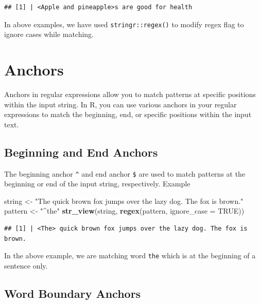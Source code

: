 \documentclass[
]{book}
\newenvironment{Shaded}{\begin{snugshade}}{\end{snugshade}}
\newcommand{\AttributeTok}[1]{\textcolor[rgb]{0.13,0.29,0.53}{#1}}
\newcommand{\ConstantTok}[1]{\textcolor[rgb]{0.56,0.35,0.01}{#1}}
\newcommand{\FunctionTok}[1]{\textcolor[rgb]{0.13,0.29,0.53}{\textbf{#1}}}
\newcommand{\NormalTok}[1]{#1}
\newcommand{\OtherTok}[1]{\textcolor[rgb]{0.56,0.35,0.01}{#1}}
\newcommand{\StringTok}[1]{\textcolor[rgb]{0.31,0.60,0.02}{#1}}
\begin{document}
\begin{verbatim}
## [1] | <Apple and pineapple>s are good for health
\end{verbatim}

In above examples, we have used \texttt{stringr::regex()} to modify regex flag to ignore cases while matching.

\hypertarget{anchors}{%
\section{Anchors}\label{anchors}}

Anchors in regular expressions allow you to match patterns at specific positions within the input string. In R, you can use various anchors in your regular expressions to match the beginning, end, or specific positions within the input text.

\hypertarget{beginning-and-end-anchors}{%
\subsection{Beginning and End Anchors}\label{beginning-and-end-anchors}}

The beginning anchor \texttt{\^{}} and end anchor \texttt{\$} are used to match patterns at the beginning or end of the input string, respectively. Example

\begin{Shaded}
\begin{Highlighting}[]
\NormalTok{string }\OtherTok{\textless{}{-}} \StringTok{"The quick brown fox jumps over the lazy dog. The fox is brown."}
\NormalTok{pattern }\OtherTok{\textless{}{-}} \StringTok{"\^{}the"}
\FunctionTok{str\_view}\NormalTok{(string, }\FunctionTok{regex}\NormalTok{(pattern, }\AttributeTok{ignore\_case =} \ConstantTok{TRUE}\NormalTok{))}
\end{Highlighting}
\end{Shaded}

\begin{verbatim}
## [1] | <The> quick brown fox jumps over the lazy dog. The fox is brown.
\end{verbatim}

In the above example, we are matching word \texttt{the} which is at the beginning of a sentence only.

\hypertarget{word-boundary-anchors}{%
\subsection{Word Boundary Anchors}\label{word-boundary-anchors}}
\end{document}
